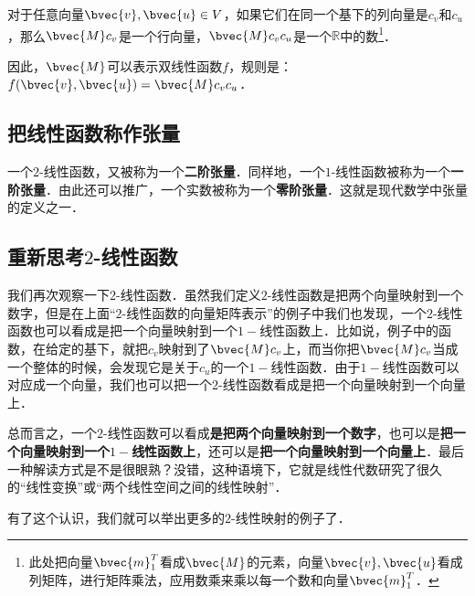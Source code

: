 对于任意向量$\bvec{v}, \bvec{u}\in V$，如果它们在同一个基下的列向量是$c_v$和$c_u$，那么$\bvec{M}c_v$是一个行向量，$\bvec{M}c_vc_u$是一个$\mathbb{R}$中的数\footnote{此处把向量$\bvec{m}_1^T$看成$\bvec{M}$的元素，向量$\bvec{v}, \bvec{u}$看成列矩阵，进行矩阵乘法，应用数乘来乘以每一个数和向量$\bvec{m}_1^T$．}．

因此，$\bvec{M}$可以表示双线性函数$f$，规则是：$f(\bvec{v}, \bvec{u})=\bvec{M}c_vc_u$．

\subsection{把线性函数称作张量}

一个$2$-线性函数，又被称为一个\textbf{二阶张量}．同样地，一个$1$-线性函数被称为一个\textbf{一阶张量}．由此还可以推广，一个实数被称为一个\textbf{零阶张量}．这就是现代数学中张量的定义之一．

\subsection{重新思考$2$-线性函数}
我们再次观察一下$2$-线性函数．虽然我们定义$2$-线性函数是把两个向量映射到一个数字，但是在上面“$2$-线性函数的向量矩阵表示”的例子中我们也发现，一个$2$-线性函数也可以看成是把一个向量映射到一个$1-$线性函数上．比如说，例子中的函数，在给定的基下，就把$c_v$映射到了$\bvec{M}c_v$上，而当你把$\bvec{M}c_v$当成一个整体的时候，会发现它是关于$c_u$的一个$1-$线性函数．由于$1-$线性函数可以对应成一个向量，我们也可以把一个$2$-线性函数看成是把一个向量映射到一个向量上．

总而言之，一个$2$-线性函数可以看成\textbf{是把两个向量映射到一个数字}，也可以是\textbf{把一个向量映射到一个$1-$线性函数上}，还可以是\textbf{把一个向量映射到一个向量上}．最后一种解读方式是不是很眼熟？没错，这种语境下，它就是线性代数研究了很久的“线性变换”或“两个线性空间之间的线性映射”．

有了这个认识，我们就可以举出更多的$2$-线性映射的例子了．

